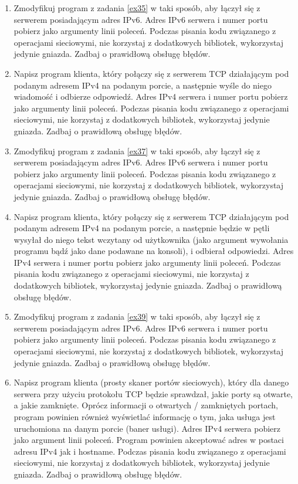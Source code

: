 \documentclass{article}
\begin{document}
\begin{enumerate}[label=\textbf{3.\arabic*}]
     \item Zmodyfikuj program z zadania \ref{ex35} w taki sposób,  aby łączył się z serwerem posiadającym adres IPv6.  Adres IPv6 serwera i numer portu pobierz jako argumenty linii poleceń. Podczas pisania kodu związanego z operacjami sieciowymi, nie korzystaj z dodatkowych bibliotek, wykorzystaj jedynie gniazda. Zadbaj o prawidłową obsługę błędów. 
     
     \item \label{ex37} Napisz program klienta, który połączy się z serwerem TCP działającym pod podanym adresem IPv4 na podanym porcie, a następnie wyśle do niego wiadomość i odbierze odpowiedź.  Adres IPv4 serwera i numer portu pobierz jako argumenty linii poleceń. Podczas pisania kodu związanego z operacjami sieciowymi, nie korzystaj z dodatkowych bibliotek, wykorzystaj jedynie gniazda. Zadbaj o prawidłową obsługę błędów. 
     
     \item Zmodyfikuj program z zadania \ref{ex37} w taki sposób,  aby łączył się z serwerem posiadającym adres IPv6.  Adres IPv6 serwera i numer portu pobierz jako argumenty linii poleceń. Podczas pisania kodu związanego z operacjami sieciowymi, nie korzystaj z dodatkowych bibliotek, wykorzystaj jedynie gniazda. Zadbaj o prawidłową obsługę błędów. 
     
     \item \label{ex39} Napisz program klienta, który połączy się z serwerem TCP działającym pod podanym adresem IPv4 na podanym porcie,  a następnie będzie w pętli wysyłał do niego tekst wczytany od użytkownika (jako argument wywołania programu bądź jako dane podawane na konsoli), i odbierał odpowiedzi.  Adres IPv4 serwera i numer portu pobierz jako argumenty linii poleceń. Podczas pisania kodu związanego z operacjami sieciowymi, nie korzystaj z dodatkowych bibliotek, wykorzystaj jedynie gniazda. Zadbaj o prawidłową obsługę błędów. 
     
     \item Zmodyfikuj program z zadania \ref{ex39} w taki sposób,  aby łączył się z serwerem posiadającym adres IPv6.  Adres IPv6 serwera i numer portu pobierz jako argumenty linii poleceń. Podczas pisania kodu związanego z operacjami sieciowymi, nie korzystaj z dodatkowych bibliotek, wykorzystaj jedynie gniazda. Zadbaj o prawidłową obsługę błędów. 

    \item  \label{ex311} Napisz program klienta (prosty skaner portów sieciowych), który dla danego serwera przy użyciu protokołu TCP będzie sprawdzał, jakie porty są otwarte, a jakie zamknięte. Oprócz informacji o otwartych / zamkniętych portach, program powinien również wyświetlać informację o tym, jaka usługa jest uruchomiona na danym porcie (baner usługi).  Adres IPv4 serwera pobierz jako argument linii poleceń. Program powinien akceptować adres w postaci adresu IPv4 jak i hostname.  Podczas pisania kodu związanego z operacjami sieciowymi, nie korzystaj z dodatkowych bibliotek, wykorzystaj jedynie gniazda. Zadbaj o prawidłową obsługę błędów.  
    

\end{enumerate}
\end{document}
